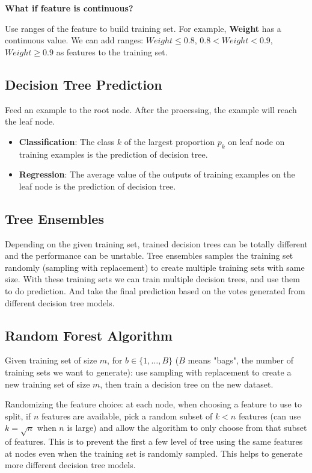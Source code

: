\documentclass{article}
\begin{document}
\noindent \textbf{What if feature is continuous?}

\noindent Use ranges of the feature to build training set. For example, \textbf{Weight} has a continuous value. We can add ranges: \(Weight \leq 0.8\), \(0.8 < Weight < 0.9\), \(Weight \geq 0.9\) as features to the training set.

\subsection{Decision Tree Prediction}

\noindent Feed an example to the root node. After the processing, the example will reach the leaf node.
\begin{itemize}
    \item \textbf{Classification}: The class \(k\) of the largest proportion \(p_{k}\) on leaf node on training examples is the prediction of decision tree.
    \item \textbf{Regression}: The average value of the outputs of training examples on the leaf node is the prediction of decision tree.
\end{itemize}

\subsection{Tree Ensembles}

Depending on the given training set, trained decision trees can be totally different and the performance can be unstable. Tree ensembles samples the training set randomly (sampling with replacement) to create multiple training sets with same size. With these training sets we can train multiple decision trees, and use them to do prediction. And take the final prediction based on the votes generated from different decision tree models.

\subsection{Random Forest Algorithm}

\noindent Given training set of size \(m\), for \(b \in \{1, \dots, B\}\) (\(B\) means "bags", the number of training sets we want to generate): use sampling with replacement to create a new training set of size \(m\),
then train a decision tree on the new dataset.

\bigskip

\noindent Randomizing the feature choice: at each node, when choosing a feature to use to split, if \(n\) features are available, pick a random subset of \(k < n\) features (can use \(k = \sqrt{n}\) when \(n\) is large) and allow the algorithm to only choose from that subset of features. This is to prevent the first a few level of tree using the same features at nodes even when the training set is randomly sampled. This helps to generate more different decision tree models.
\end{document}
